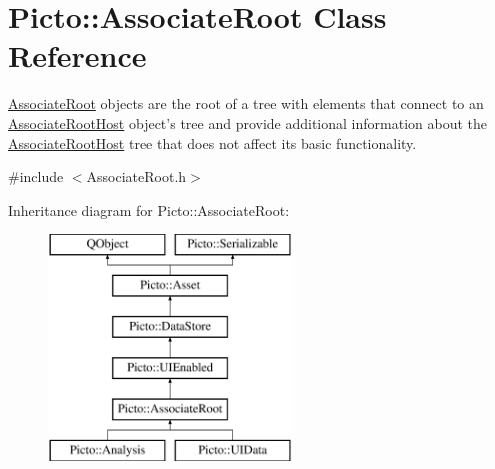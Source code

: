 \hypertarget{class_picto_1_1_associate_root}{\section{Picto\-:\-:Associate\-Root Class Reference}
\label{class_picto_1_1_associate_root}
}


\hyperlink{class_picto_1_1_associate_root}{Associate\-Root} objects are the root of a tree with elements that connect to an \hyperlink{class_picto_1_1_associate_root_host}{Associate\-Root\-Host} object's tree and provide additional information about the \hyperlink{class_picto_1_1_associate_root_host}{Associate\-Root\-Host} tree that does not affect its basic functionality.  




{\ttfamily \#include $<$Associate\-Root.\-h$>$}

Inheritance diagram for Picto\-:\-:Associate\-Root\-:\begin{figure}[H]
\begin{center}
\leavevmode
\includegraphics[height=6.000000cm]{class_picto_1_1_associate_root}
\end{center}
\end{figure}
